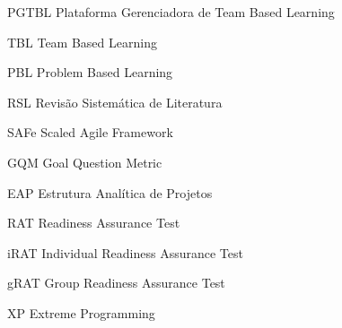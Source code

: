 \begin{siglas}
  \item[PGTBL] Plataforma Gerenciadora de Team Based Learning
  \item[TBL] Team Based Learning
  \item[PBL] Problem Based Learning
  \item[RSL] Revisão Sistemática de Literatura
  \item[SAFe] Scaled Agile Framework
  \item[GQM] Goal Question Metric
  \item[EAP] Estrutura Analítica de Projetos
  \item[RAT] Readiness Assurance Test
  \item[iRAT] Individual Readiness Assurance Test
  \item[gRAT] Group Readiness Assurance Test
  \item[XP] Extreme Programming
\end{siglas}
